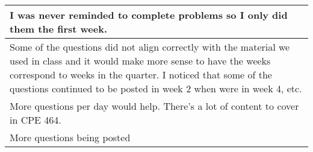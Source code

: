\begin{longtable}{|p{1\linewidth}|}
		\hline
		I was never reminded to complete problems so I only did them the first week.                                                                                                                                                                                                                                                                                                                                                                                                                                                                                                                                                                                                                     \\
		\hline
		Some of the questions did not align correctly with the material we used in class and it would make more sense to have the weeks correspond to weeks in the quarter. I noticed that some of the questions continued to be posted in week 2 when were in week 4, etc.                                                                                                                                                                                                                                                                                                                                                                                                                              \\
		\hline
		More questions per day would help. There's a lot of content to cover in CPE 464.                                                                                                                                                                                                                                                                                                                                                                                                                                                                                                                                                                                                                 \\
		\hline
		More questions being posted                                                                                                                                                                                                                                                                                                                                                                                                                                                                                                                                                                                                                                                                      \\

\end{longtable}
